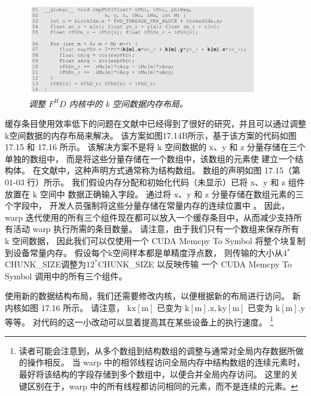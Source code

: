 \begin{figure}[H]
	\centering
	\includegraphics[width=0.9\textwidth]{figs/F17.16.png}
	\caption{\textit{调整 $F^H D$ 内核中的 k 空间数据内存布局。}}
\end{figure}

缓存条目使用效率低下的问题在文献中已经得到了很好的研究，并且可以通过调整k空间数据的内存布局来解决。 
该方案如图17.14B所示，基于该方案的代码如图  17.15 和 17.16 所示。 
该解决方案不是将 k 空间数据的 $\mathrm{x}、\mathrm{y}$ 和 $\mathrm{z}$ 分量存储在三个单独的数组中，
而是将这些分量存储在一个数组中，该数组的元素使 建立一个结构体。 在文献中，这种声明方式通常称为结构数组。 
数组的声明如图 17.15（第 01-03 行）所示。 
我们假设内存分配和初始化代码（未显示）已将 $\mathrm{x}、\mathrm{y}$ 和 $\mathrm{z}$ 组件
放置在 $\mathrm{k}$ 空间中 数据正确输入字段。 
通过将 $\mathrm{x}、\mathrm{y}$ 和 $\mathrm{z}$ 分量存储在数组元素的三个字段中，
开发人员强制将这些分量存储在常量内存的连续位置中 。 
因此，warp 迭代使用的所有三个组件现在都可以放入一个缓存条目中，从而减少支持所有活动 warp 执行所需的条目数量。 
请注意，由于我们只有一个数组来保存所有 k 空间数据，
因此我们可以仅使用一个 CUDA Memcpy To Symbol 将整个块复制到设备常量内存。 
假设每个k空间样本都是单精度浮点数，
则传输的大小从$4{}^{*}$CHUNK\_SIZE调整为$12^{*}$CHUNK\_SIZE
以反映传输 一个 CUDA Memcpy To Symbol 调用中的所有三个组件。

使用新的数据结构布局，我们还需要修改内核，以便根据新的布局进行访问。 新内核如图 17.16 所示。 
请注意， $\mathrm{kx}[\mathrm{m}]$ 已变为 $\mathrm{k}[\mathrm{m}].\mathrm{x}, \mathrm{ky}[\mathrm{m}]$ 已变为 $\mathrm{k}[\mathrm{m}].\mathrm{y}$ 等等。 
对代码的这一小改动可以显着提高其在某些设备上的执行速度。
\footnote{读者可能会注意到，从多个数组到结构数组的调整与通常对全局内存数据所做的操作相反。 
当 warp 中的相邻线程访问全局内存中结构数组的连续元素时，最好将该结构的字段存储到多个数组中，以便合并全局内存访问。 
这里的关键区别在于，warp 中的所有线程都访问相同的元素，而不是连续的元素。}

